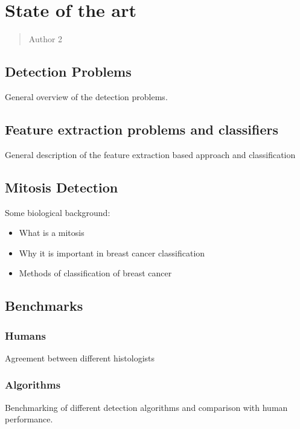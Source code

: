 \chapter{State of the art}
\label{chapter2}
\thispagestyle{empty}

\begin{quotation}
{\footnotesize
{}
\begin{flushright}
Author 2
\end{flushright}
}
\end{quotation}
\vspace{0.5cm}


\section{Detection Problems}
General overview of the detection problems.

\vspace{0.5cm}

\section{Feature extraction problems and classifiers}
General description of the feature extraction based approach and classification

\vspace{0.5cm}

\section{Mitosis Detection}
Some biological background:
\begin{itemize}
\item What is a mitosis
\item Why it is important in breast cancer classification
\item Methods of classification of breast cancer
\end{itemize}

\section{Benchmarks}

\vspace{0.5cm}

\subsection{Humans}
Agreement between different histologists

\subsection{Algorithms}
Benchmarking of different detection algorithms and comparison with human performance.